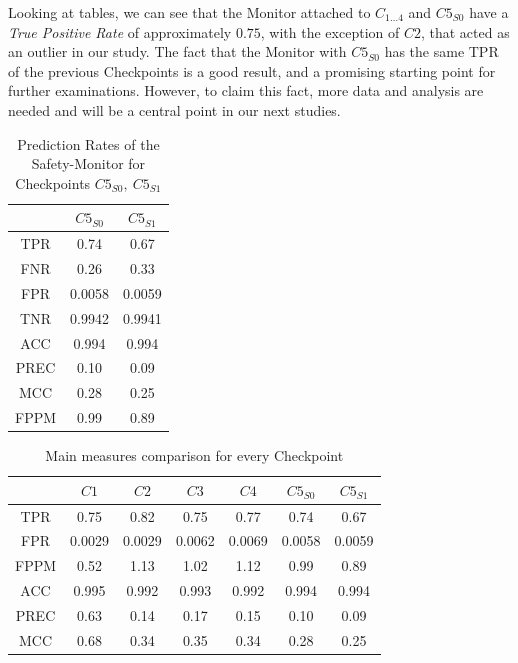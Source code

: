 Looking at tables, we can see that the Monitor attached to $C_{1\dots 4}$ and $C5_{S0}$ have a \textsl{True Positive Rate} of approximately $0.75$, with the exception of $C2$, that acted as an outlier in our study. The fact that the Monitor with $C5_{S0}$ has the same TPR of the previous Checkpoints is a good result, and a promising starting point for further examinations. However, to claim this fact, more data and analysis are needed and will be a central point in our next studies.\newline

\begin{table}[h]
	\begin{center}
		\begin{tabular}{ |c|c|c| }
			\hline
			& $C5_{S0}$ & $C5_{S1}$ \\
			\hline
			TPR & 0.74 & 0.67 \\
			\hline
			FNR & 0.26 & 0.33 \\
			\hline
			FPR & 0.0058 & 0.0059 \\
			\hline
			TNR & 0.9942 & 0.9941 \\
			\hline
			ACC & 0.994 & 0.994 \\
			\hline
			PREC & 0.10 & 0.09 \\
			\hline
			MCC & 0.28 & 0.25 \\
			\hline
			FPPM & 0.99 & 0.89 \\
			\hline
		\end{tabular}
		\caption{Prediction Rates of the Safety-Monitor for Checkpoints $C5_{S0},\: C5_{S1}$}
	\end{center}
\end{table}

\begin{table}[h]
	\begin{center}
		\begin{tabular}{ |c|c|c|c|c||c|c| }
			\hline
			& $C1$ & $C2$ & $C3$ & $C4$ & $C5_{S0}$ & $C5_{S1}$ \\
			\hline
			TPR & 0.75 & 0.82 & 0.75 & 0.77 & 0.74 & 0.67 \\
			\hline
			FPR & 0.0029 & 0.0029 & 0.0062 & 0.0069 & 0.0058 & 0.0059 \\
			\hline
			FPPM & 0.52 & 1.13 & 1.02 & 1.12 & 0.99 & 0.89 \\
			\hline
			ACC & 0.995 & 0.992 & 0.993 & 0.992 & 0.994 & 0.994\\
			\hline
			PREC & 0.63 & 0.14 & 0.17 & 0.15 & 0.10 & 0.09\\
			\hline
			MCC & 0.68 & 0.34 & 0.35 & 0.34 & 0.28 & 0.25 \\
			\hline
		\end{tabular}
		
		\caption{Main measures comparison for every Checkpoint}
	\end{center}
\end{table}

